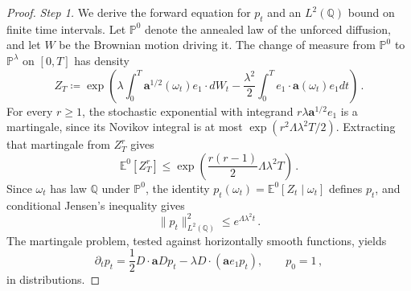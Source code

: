 \documentclass[11pt]{amsart}
\theoremstyle{definition}
\theoremstyle{remark}
\numberwithin{equation}{section}
\newcommand{\Q}{\mathbb Q}
\renewcommand{\a}{\mathbf a}
\begin{document}
\begin{proof}
\emph{Step 1.} We derive the forward equation for $p_t$ and an $L^2(\Q)$ bound on finite time intervals. Let $\mathbb P^0$ denote the annealed law of the unforced diffusion, and let $W$ be the Brownian motion driving it. The change of measure from $\mathbb P^0$ to $\mathbb P^\lambda$ on $[0,T]$ has density
\begin{equation}\label{entropy.girsanov}
 Z_T\coloneqq\exp\left(
 \lambda\int_0^T\a^{1/2}(\omega_t)e_1\cdot dW_t
 -\frac{\lambda^2}{2}\int_0^T e_1\cdot\a(\omega_t)e_1dt
 \right)\, .
\end{equation}
For every $r\geq1$, the stochastic exponential with integrand $r\lambda\a^{1/2}e_1$ is a martingale, since its Novikov integral is at most $\exp(r^2\Lambda\lambda^2T/2)$. Extracting that martingale from $Z_T^r$ gives
\begin{equation*}
 \mathbb E^0[Z_T^r]
 \leq\exp\left(\frac{r(r-1)}2\Lambda\lambda^2T\right)\, .
\end{equation*}
Since $\omega_t$ has law $\Q$ under $\mathbb P^0$, the identity $p_t(\omega_t)=\mathbb E^0[Z_t\mid\omega_t]$ defines $p_t$, and conditional Jensen's inequality gives
\begin{equation}\label{entropy.finite.L2}
 \|p_t\|_{L^2(\Q)}^2\leq e^{\Lambda\lambda^2t}\, .
\end{equation}
The martingale problem, tested against horizontally smooth functions, yields
\begin{equation}\label{entropy.forward}
 \partial_t p_t=\frac12D\cdot\a Dp_t
              -\lambda D\cdot(\a e_1p_t),
 \qquad p_0=1\, ,
\end{equation}
in distributions.


\end{proof}
\end{document}

